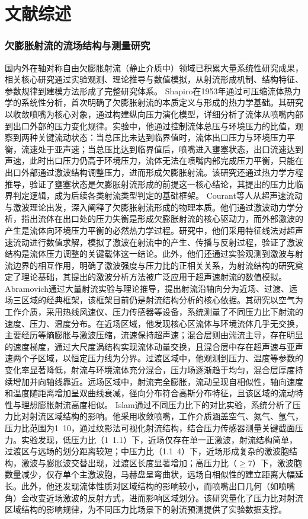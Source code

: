 ﻿\chapter{文献综述}
\subsection{欠膨胀射流的流场结构与测量研究}
国内外在轴对称自由欠膨胀射流（静止介质中）领域已积累大量系统性研究成果，相关核心研究通过实验观测、理论推导与数值模拟，从射流形成机制、结构特征、参数规律到建模方法形成了完整研究体系。
Shapiro在1953年通过可压缩流体热力学的系统性分析\supercite{shapiro1954dynamics}，首次明确了欠膨胀射流的本质定义与形成的热力学基础。其研究以收敛喷嘴为核心对象，通过构建纵向压力演化模型，详细分析了流体从喷嘴内部到出口外部的压力变化规律。实验中，他通过控制流体总压与环境压力的比值，观察到两种关键流动状态：当总压比未达到临界值时，流体出口压力与环境压力平衡，流速处于亚声速；当总压比达到临界值后，喷嘴进入壅塞状态，出口流速达到声速，此时出口压力仍高于环境压力，流体无法在喷嘴内部完成压力平衡，只能在出口外部通过激波结构调整压力，进而形成欠膨胀射流。该研究还通过热力学方程推导，验证了壅塞状态是欠膨胀射流形成的前提这一核心结论，其提出的压力比临界判定逻辑，成为后续各类射流类型判定的基础框架。
Courant等人从超声速流动与激波理论出发\supercite{courant1948formation}，深入阐释了欠膨胀射流形成的物理本质。他们通过激波动力学分析，指出流体在出口处的压力失衡是形成欠膨胀射流的核心驱动力，而外部激波的产生是流体向环境压力平衡的必然热力学过程。研究中，他们采用特征线法对超声速流动进行数值求解，模拟了激波在射流中的产生、传播与反射过程，验证了激波结构是流体压力调整的关键载体这一结论。此外，他们还通过实验观测到激波与射流边界的相互作用，明确了激波强度与压力比的正相关关系，为射流结构的研究奠定了理论基础，其提出的激波分析方法被广泛应用于超声速射流的数值模拟。
Abramovich通过大量射流实验与理论推导\supercite{abramovich1963theory}，提出射流沿轴向分为近场、过渡、远场三区域的经典框架，该框架目前仍是射流结构分析的核心依据。其研究以空气为工作介质，采用热线风速仪、压力传感器等设备，系统测量了不同压力比下射流的速度、压力、温度分布。在近场区域，他发现核心区流体与环境流体几乎无交换，主要经历等熵膨胀与激波压缩，流速保持超声速；混合层则由湍流主导，存在明显的速度梯度，通过大尺度涡结构实现流体动量交换，且混合层中存在超声速与亚声速两个子区域，以恒定压力线为分界。过渡区域中，他观测到压力、温度等参数的变化率显著降低，射流与环境流体充分混合，压力场逐渐趋于均匀，混合层厚度持续增加并向轴线靠近。远场区域中，射流完全膨胀，流动呈现自相似性，轴向速度和温度随距离增加呈双曲线衰减，径向分布符合高斯分布特征，且该区域的流动特性与理想膨胀射流高度相似。
Islam通过不同压力比下的对比实验\supercite{islam2024theoretical}，系统分析了压力比对射流区域结构的影响。他采用收敛喷嘴，工作介质涵盖空气、氮气、氩气，压力比范围为1~10，通过纹影法可视化射流结构，结合压力传感器测量关键截面压力。实验发现，低压力比（1~1.1）下，近场仅存在单一正激波，射流结构简单，过渡区与远场的划分距离较短；中压力比（1.1~4）下，近场形成复杂的激波胞结构，激波与膨胀波交替出现，过渡区长度显著增加；高压力比（$\ge$7）下，激波胞数量减少，仅存单个主激波胞，马赫盘呈弯曲状，远场自相似性的建立距离大幅延长。此外，他还发现流体性质对区域结构的影响较小，而喷嘴出口几何（如喷嘴角）会改变近场激波的反射方式，进而影响区域划分。该研究量化了压力比对射流区域结构的影响规律，为不同压力比场景下的射流预测提供了实验数据支撑。
